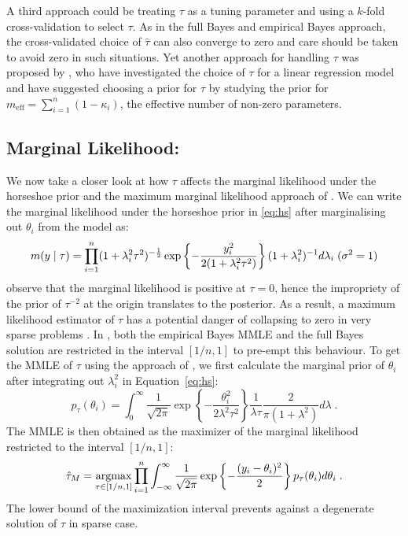 \documentclass[11pt]{article}
\begin{document}
A third approach could be treating $\tau$ as a tuning parameter and using a
$k$-fold cross-validation to select $\tau$.  As in the full Bayes and empirical
Bayes approach, the cross-validated choice of $\hat{\tau}$ can also converge to
zero and care should be taken to avoid zero in such situations. Yet another
approach for handling $\tau$ was proposed by \citet{piironen2016hyperprior},
who have investigated the choice of $\tau$ for a linear regression model and
have suggested choosing a prior for $\tau$ by studying the prior for
$m_{\text{eff}} = \sum_{i=1}^{n} (1-\kappa_i)$, the effective number of
non-zero parameters. 


\subsection{Marginal Likelihood: } We now take a closer look at how $\tau$
affects the marginal likelihood under the horseshoe prior and the maximum
marginal likelihood approach of \cite{van2017adaptive}. 
We can write the marginal likelihood under the horseshoe prior in \eqref{eq:hs}
after marginalising out $\theta_i$ from the model as:
\begin{equation}
  m(y \mid \tau) = \prod_{i=1}^{n} (1+\lambda_i^2 \tau^2)^{-\frac{1}{2}} \exp \left
  \{ - \frac{y_i^2}{2(1+\lambda_i^2 \tau^2)} \right \}  (1+\lambda_i^2)^{-1} d
  \lambda_i \; (\sigma^2 = 1)
\end{equation}
\citet{tiao1965bayesian} observe that the marginal likelihood is positive at 
$\tau = 0$, hence the impropriety of the prior of $\tau^{-2}$ at the origin
translates to the posterior. As a result, a maximum likelihood estimator of
$\tau$ has a potential danger of collapsing to zero in very sparse problems
\citep{polson2010shrink, datta2013asymptotic}. In \cite{van2017adaptive}, 
both the empirical Bayes MMLE and the full Bayes solution are
restricted in the interval $[1/n,1]$ to pre-empt this behaviour. To get the
MMLE of $\tau$ using the approach of \cite{van2017adaptive}, we first calculate the
marginal prior of $\theta_i$ after integrating out $\lambda_i^2$ in 
Equation~\eqref{eq:hs}:
\begin{equation}
  p_{\tau}(\theta_i) = \int_{0}^{\infty} \frac{1}{\sqrt{2 \pi}} \exp \left\{ -
  \frac{\theta_i^2}{2\lambda^2 \tau^2} \right\} \frac{1}{\lambda \tau}
  \frac{2}{\pi(1+\lambda^2)} d\lambda
  \;.
\end{equation}
The MMLE is then obtained as the maximizer of the marginal likelihood
restricted to the interval $[1/n,1]$: 
\begin{equation}
  \hat{\tau}_M = \argmax_{\tau \in [1/n,1]} \prod_{i=1}^{n}
  \int_{-\infty}^{\infty} \frac{1}{\sqrt{2 \pi}} \exp \left\{ - \frac{(y_i
  -\theta_i)^2}{2} \right\} p_{\tau}(\theta_i) d\theta_i
  \;.
\end{equation}
The lower bound of the maximization interval prevents against a degenerate
solution of $\tau$ in sparse case. 
\end{document}
